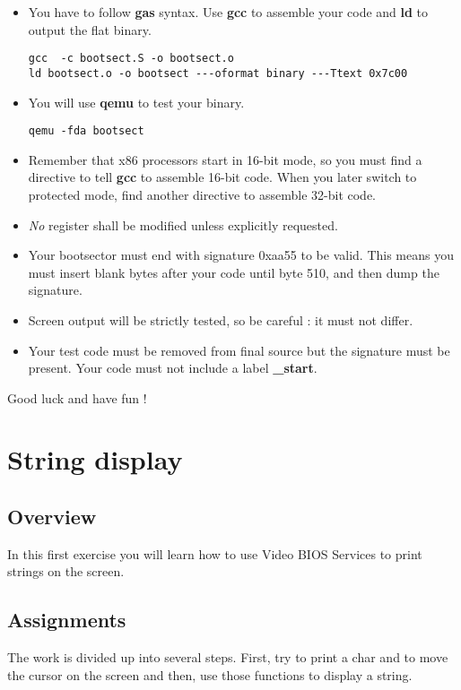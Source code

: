 \begin{itemize}
\item
  You have to follow \textbf{gas} syntax. Use \textbf{gcc} to assemble your
  code and \textbf{ld} to output the flat binary.
  \begin{verbatim}
gcc  -c bootsect.S -o bootsect.o
ld bootsect.o -o bootsect ---oformat binary ---Ttext 0x7c00
  \end{verbatim}
\item
  You will use \textbf{qemu} to test your binary.
  \begin{verbatim}
qemu -fda bootsect
  \end{verbatim}
\item
  Remember that x86 processors start in 16-bit mode, so you must find a
  directive to tell \textbf{gcc} to assemble 16-bit code. When you later
  switch to protected mode, find another directive to assemble 32-bit code.
\item
  \emph{No} register shall be modified unless explicitly requested.
\item
  Your bootsector must end with signature 0xaa55 to be valid. This means you
  must insert blank bytes after your code until byte 510, and then dump
  the signature.
\item
  Screen output will be strictly tested, so be careful : it must not
  differ.
\item
  Your test code must be removed from final source but the signature must be
  present. Your code must not include a label \textbf{\_start}.
\end{itemize}

Good luck and have fun !

%
%

\newpage

\section{String display}

\subsection*{Overview}
In this first exercise you will learn how to use Video BIOS Services to
print strings on the screen.

\subsection*{Assignments}
The work is divided up into several steps. First, try to print a char and
to move the cursor on the screen and then, use those functions to display
a string.

